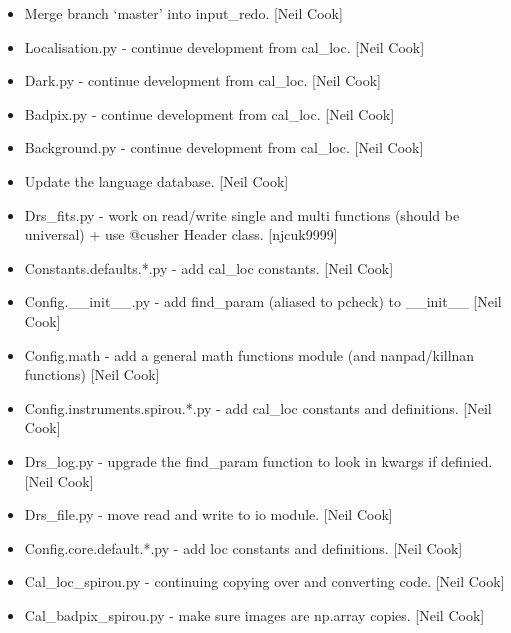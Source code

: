 \documentclass[a4paper,10pt,english]{report}
\begin{document}
\begin{itemize}
\item {} 
Merge branch ‘master’ into input\_redo. {[}Neil Cook{]}

\item {} 
Localisation.py - continue development from cal\_loc. {[}Neil Cook{]}

\item {} 
Dark.py - continue development from cal\_loc. {[}Neil Cook{]}

\item {} 
Badpix.py - continue development from cal\_loc. {[}Neil Cook{]}

\item {} 
Background.py - continue development from cal\_loc. {[}Neil Cook{]}

\item {} 
Update the language database. {[}Neil Cook{]}

\item {} 
Drs\_fits.py - work on read/write single and multi functions (should be
universal) + use @cusher Header class. {[}njcuk9999{]}

\item {} 
Constants.defaults.*.py - add cal\_loc constants. {[}Neil Cook{]}

\item {} 
Config.\_\_init\_\_.py - add find\_param (aliased to pcheck) to \_\_init\_\_
{[}Neil Cook{]}

\item {} 
Config.math - add a general math functions module (and nanpad/killnan
functions) {[}Neil Cook{]}

\item {} 
Config.instruments.spirou.*.py - add cal\_loc constants and
definitions. {[}Neil Cook{]}

\item {} 
Drs\_log.py - upgrade the find\_param function to look in kwargs if
definied. {[}Neil Cook{]}

\item {} 
Drs\_file.py - move read and write to io module. {[}Neil Cook{]}

\item {} 
Config.core.default.*.py - add loc constants and definitions. {[}Neil
Cook{]}

\item {} 
Cal\_loc\_spirou.py - continuing copying over and converting code. {[}Neil
Cook{]}

\item {} 
Cal\_badpix\_spirou.py - make sure images are np.array copies. {[}Neil
Cook{]}


\end{itemize}
\end{document}
